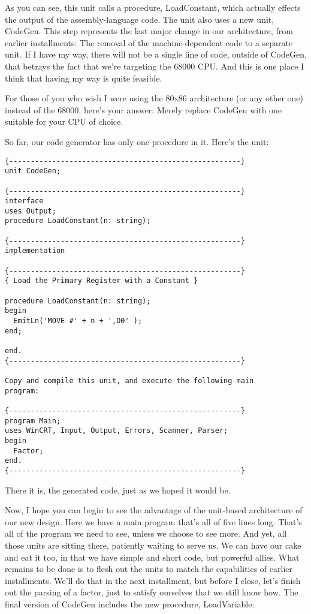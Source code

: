 As you can see, this unit calls a procedure, LoadConstant, which actually effects the output of the assembly-language code. The unit also uses a new unit, CodeGen. This step represents the last major change in our architecture, from earlier installments: The removal of the machine-dependent code to a separate unit. If I have my way, there will not be a single line of code, outside of CodeGen, that betrays the fact that we're targeting the 68000 CPU. And this is one place I think that having my way is quite feasible.

For those of you who wish I were using the 80x86 architecture (or any other one) instead of the 68000, here's your answer:  Merely replace CodeGen with one suitable for your CPU of choice.

So far, our code generator has only one procedure in it. Here's the unit:

\begin{verbatim}
{------------------------------------------------------}
unit CodeGen;

{------------------------------------------------------}
interface
uses Output;
procedure LoadConstant(n: string);

{------------------------------------------------------}
implementation

{------------------------------------------------------}
{ Load the Primary Register with a Constant }

procedure LoadConstant(n: string);
begin
  EmitLn('MOVE #' + n + ',D0' );
end;

end.
{------------------------------------------------------}

Copy and compile this unit, and execute the following main
program:

{------------------------------------------------------}
program Main;
uses WinCRT, Input, Output, Errors, Scanner, Parser;
begin
  Factor;
end.
{------------------------------------------------------}
\end{verbatim}

There it is, the generated code, just as we hoped it would be.

Now, I hope you can begin to see the advantage of the unit-based architecture of our new design. Here we have a main program that's all of five lines long. That's all of the program we need to see, unless we choose to see more. And yet, all those units are sitting there, patiently waiting to serve us. We can have our cake and eat it too, in that we have simple and short code, but powerful allies. What remains to be done is to flesh out the units to match the capabilities of earlier installments. We'll do that in the next installment, but before I close, let's finish out the parsing of a factor, just to satisfy ourselves that we still know how. The final version of CodeGen includes the new procedure, LoadVariable:

